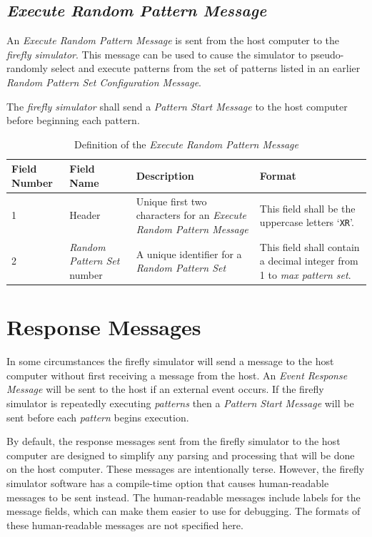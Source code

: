 \documentclass[letterpaper,11pt]{article}
\begin{document}
\subsection{\textit{Execute Random Pattern Message}}

An \textit{Execute Random Pattern Message} is sent from the host computer to the
\textit{firefly simulator}. This message can be used to cause the simulator to
pseudo-randomly select and execute patterns from the set of patterns listed
in an earlier \textit{Random Pattern Set Configuration Message}.

The \textit{firefly simulator} shall send a \textit{Pattern Start Message}
to the host computer before beginning each pattern.

\begin{table}[H]
  \caption{Definition of the \textit{Execute Random Pattern Message}}
  \centering
  \setlength\extrarowheight{2pt}
  \begin{tabular}[h]{|p{0.5in}|p{1.00in}|p{2.25in}|p{2.25in}|} \hline
    Field Number & Field Name & Description & Format \\ \hline
    1            & Header
                 & Unique first two characters for an \textit{Execute Random
                 Pattern Message}
                 & This field shall be the uppercase letters `\texttt{XR}'.
                 \\ \hline
    2            & \textit{Random Pattern Set} number
                 & A unique identifier for a \textit{Random Pattern Set}
                 & This field shall contain a decimal integer from 1 to
                 \textit{max pattern set}.
                 \\ \hline
  \end{tabular}
  \label{tab:ExecuteRandom}
\end{table}

\section{Response Messages}

In some circumstances the firefly simulator will send a message to the host
computer without first receiving a message from the host. An \textit{Event
Response Message} will be sent to the host if an external event occurs. If the
firefly simulator is repeatedly executing \textit{patterns} then a
\textit{Pattern Start Message} will be sent before each \textit{pattern} begins execution.

By default, the response messages sent from the firefly simulator to the host
computer are designed to simplify any parsing and processing that will be done
on the host computer. These messages are intentionally terse. However, the
firefly simulator software has a compile-time option that causes human-readable
messages to be sent instead. The human-readable messages include labels for
the message fields, which can make them easier to use for debugging. The
formats of these human-readable messages are not specified here.
\end{document}
